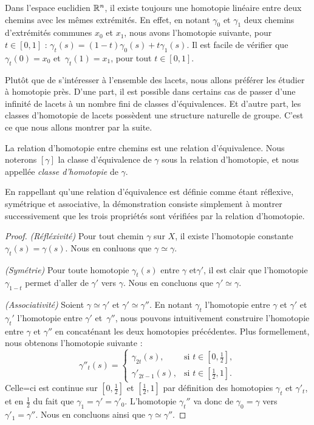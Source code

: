 \begin{exemple}
Dans l'espace euclidien $\mathbb{R}^n$, il existe toujours une homotopie linéaire entre deux chemins avec les mêmes extrémités. En effet, en notant $\gamma_0$ et $\gamma_1$ deux chemins d'extrémités communes $x_0$ et $x_1$, nous avons l'homotopie suivante, pour~$t\in[0,1]$ :  $\gamma_t(s)=(1-t)\gamma_0(s)+t\gamma_1(s)$. Il est facile de vérifier que $\gamma_t(0)=x_0$ et~$\gamma_t(1)=x_1$, pour tout $t\in[0,1]$.
\end{exemple}

Plutôt que de s'intéresser à l'ensemble des lacets, nous allons préférer les étudier à homotopie près. D'une part, il est possible dans certains cas de passer d'une infinité de lacets à un nombre fini de classes d'équivalences. Et d'autre part, les classes d'homotopie de lacets possèdent une structure naturelle de groupe. C'est ce que nous allons montrer par la suite.

\begin{proposition}
La relation d'homotopie entre chemins est une relation d'équivalence. Nous noterons $[\gamma]$ la classe d'équivalence de $\gamma$ sous la relation d'homotopie, et nous appellée \emph{classe d'homotopie} de $\gamma$.
\end{proposition}

En rappellant qu'une relation d'équivalence est définie comme étant réflexive, symétrique et associative, la démonstration consiste simplement à montrer successivement que les trois propriétés sont vérifiées par la relation d'homotopie.
\begin{proof}
\textit{(Réfléxivité)} Pour tout chemin $\gamma$ sur $X$, il existe l'homotopie constante $\gamma_t(s)=\gamma(s)$. Nous en conluons que $\gamma\simeq\gamma$.

\textit{(Symétrie)} Pour toute homotopie $\gamma_t(s)$ entre $\gamma$ et$\gamma'$, il est clair que l'homotopie $\gamma_{1-t}$ permet d'aller de $\gamma'$ vers $\gamma$. Nous en concluons que $\gamma'\simeq\gamma$.

\textit{(Associativité)} Soient $\gamma\simeq\gamma'$ et $\gamma'\simeq\gamma''$. En notant $\gamma_t$ l'homotopie entre $\gamma$ et $\gamma'$ et $\gamma_t'$ l'homotopie entre $\gamma'$ et~$\gamma''$, nous pouvons intuitivement construire l'homotopie entre $\gamma$ et $\gamma''$ en concaténant les deux homotopies précédentes. Plus formellement, nous obtenons l'homotopie suivante : \[\gamma''_t(s)= \left\{\begin{matrix}
\gamma_{2t}(s),&\text{si }t\in[0,\frac{1}{2}], \\
\gamma'_{2t-1}(s),&\text{si }t\in[\frac{1}{2},1].
\end{matrix}\right.\]Celle=ci est continue sur $[0,\frac{1}{2}]$ et $[\frac{1}{2},1]$ par définition des homotopies $\gamma_t$ et $\gamma'_t$, et en $\frac{1}{2}$ du fait que $\gamma_1=\gamma'=\gamma'_0$. L'homotopie $\gamma_t''$ va donc de $\gamma_0=\gamma$ vers~$\gamma'_1=\gamma''$. Nous en concluons ainsi que $\gamma\simeq\gamma''$.
\end{proof}

